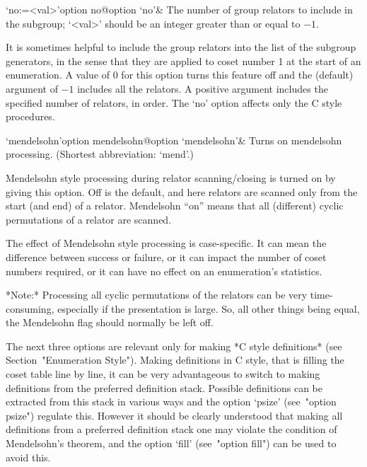 \>`no:=<val>'{option no}@{option `no'}&
The number of group relators to include in the subgroup;  
`<val>' should be an integer greater than or equal to $-1$.

It is sometimes helpful to include the group relators into the list of
the subgroup generators, in the sense that they are applied  to  coset
number 1 at the start of an enumeration. A value of 0 for this  option
turns this feature off and the (default) argument of $-1$ includes all
the relators. A positive argument includes  the  specified  number  of
relators,  in  order.  The  `no'  option  affects  only  the   C style
procedures.

\>`mendelsohn'{option mendelsohn}@{option `mendelsohn'}&
Turns on mendelsohn processing. (Shortest abbreviation: `mend'.)

Mendelsohn style processing during relator scanning/closing is  turned
on by giving this option. Off is the default, and  here  relators  are
scanned only from the start (and end) of a relator. Mendelsohn  ``on''
means that all  (different)  cyclic  permutations  of  a  relator  are
scanned.

The effect of Mendelsohn style processing  is  case-specific.  It  can
mean the difference between success or failure, or it can  impact  the
number of coset numbers required, or it  can  have  no  effect  on  an
enumeration's statistics.

*Note:* Processing all cyclic permutations of the relators can be very
time-consuming,  especially if  the  presentation is  large.  So,  all
other things being equal, the  Mendelsohn flag should normally be left
off.

\enditems


The  next  three  options  are  relevant  only  for  making  *C  style
definitions* (see Section~"Enumeration Style"). Making definitions  in
C style, that is filling the coset table line by line, it can be  very
advantageous to  switch  to  making  definitions  from  the  preferred
definition stack. Possible definitions  can  be  extracted  from  this
stack in  various  ways  and  the option `psize' (see~"option psize")
regulate  this.
However it should be clearly understood that  making  all  definitions
from a preferred definition stack one may  violate  the  condition  of
Mendelsohn's theorem, and the option `fill' (see~"option fill") can be
used to avoid this.

